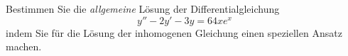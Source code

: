 \begin{atiTask}[
  title = Inhomogene Differentialgleichung 2. Ordnung
]
Bestimmen Sie die \textit{allgemeine} Lösung der Differentialgleichung
\begin{equation*}
y''-2y'-3y=64xe^{x}
\end{equation*}
indem Sie für die Lösung der inhomogenen Gleichung einen speziellen Ansatz machen.
\end{atiTask}
